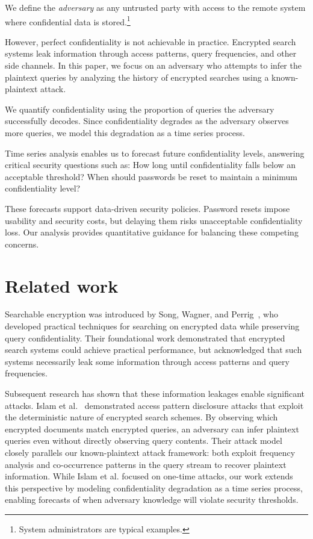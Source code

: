\documentclass[final,11pt]{article}
\theoremstyle{plain}
\theoremstyle{remark}
\begin{document}
We define the \emph{adversary} as any untrusted party with access to the
remote system where confidential data is stored.\footnote{System administrators
are typical examples.}

However, perfect confidentiality is not achievable in practice. Encrypted
search systems leak information through access patterns, query frequencies,
and other side channels. In this paper, we focus on an adversary who attempts
to infer the plaintext queries by analyzing the history of encrypted searches
using a known-plaintext attack.

We quantify confidentiality using the proportion of queries the adversary
successfully decodes. Since confidentiality degrades as the adversary observes
more queries, we model this degradation as a time series process.

Time series analysis enables us to forecast future confidentiality levels,
answering critical security questions such as: How long until confidentiality
falls below an acceptable threshold? When should passwords be reset to
maintain a minimum confidentiality level?

These forecasts support data-driven security policies. Password resets impose
usability and security costs, but delaying them risks unacceptable
confidentiality loss. Our analysis provides quantitative guidance for
balancing these competing concerns.

\hypertarget{related-work}{%
\section{Related work}\label{related-work}}

Searchable encryption was introduced by Song, Wagner, and Perrig~\cite{song2000practical},
who developed practical techniques for searching on encrypted data while preserving
query confidentiality. Their foundational work demonstrated that encrypted search
systems could achieve practical performance, but acknowledged that such systems
necessarily leak some information through access patterns and query frequencies.

Subsequent research has shown that these information leakages enable significant
attacks. Islam et al.~\cite{islam2012access} demonstrated access pattern disclosure
attacks that exploit the deterministic nature of encrypted search schemes. By
observing which encrypted documents match encrypted queries, an adversary can
infer plaintext queries even without directly observing query contents. Their
attack model closely parallels our known-plaintext attack framework: both exploit
frequency analysis and co-occurrence patterns in the query stream to recover
plaintext information. While Islam et al. focused on one-time attacks, our work
extends this perspective by modeling confidentiality degradation as a time series
process, enabling forecasts of when adversary knowledge will violate security
thresholds.
\end{document}
